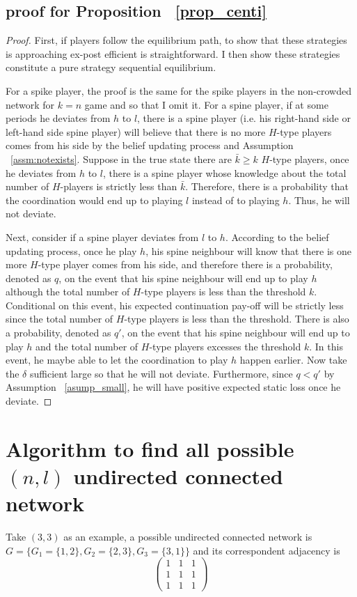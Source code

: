 \documentclass[12pt,letter]{article}
\theoremstyle{remark}
\theoremstyle{remark}
\theoremstyle{claim}
\begin{document}
\subsection{proof for Proposition ~\ref{prop_centi}}
\begin{proof}

First, if players follow the equilibrium path, to show that these strategies is approaching ex-post efficient is straightforward. I then show these strategies constitute a pure strategy sequential equilibrium.

For a spike player, the proof is the same for the spike players in the non-crowded network for $k=n$ game and so that I omit it. For a spine player, if at some periods he deviates from $h$ to $l$, there is a spine player (i.e. his right-hand side or left-hand side spine player) will believe that there is no more $H$-type players comes from his side by the belief updating process and Assumption ~\ref{assm:notexists}. Suppose in the true state there are $\bar{k}\geq k$ $H$-type players, once he deviates from $h$ to $l$, there is a spine player whose knowledge about the total number of $H$-players is strictly less than $\bar{k}$. Therefore, there is a probability that the coordination would end up to playing $l$ instead of to playing $h$. Thus, he will not deviate.

Next, consider if a spine player deviates from $l$ to $h$. According to the belief updating process, once he play $h$, his spine neighbour will know that there is one more $H$-type player comes from his side, and therefore there is a probability, denoted as $q$, on the event that his spine neighbour will end up to play $h$ although the total number of $H$-type players is less than the threshold $k$. Conditional on this event, his expected continuation pay-off will be strictly less since the total number of $H$-type players is less than the threshold. There is also a probability, denoted as $q'$, on the event that his spine neighbour will end up to play $h$ and the total number of $H$-type players excesses the threshold $k$. In this event, he maybe able to let the coordination to play $h$ happen earlier. Now take the $\delta$ sufficient large so that he will not deviate. Furthermore, since $q<q'$ by Assumption ~\ref{asump_small}, he will have positive expected static loss once he deviate.
\end{proof}


\section{Algorithm to find all possible $(n,l)$ undirected connected network}
Take $(3,3)$ as an example, a possible undirected connected network is $G=\{G_1=\{1,2\},G_2=\{2,3\},G_3=\{3,1\}\}$ and its correspondent adjacency is
\[
\left( {\begin{array}{ccc}
 1 & 1 & 1 \\
 1 & 1 & 1\\
 1 & 1 & 1
 \end{array} } \right)
\]
\end{document}
